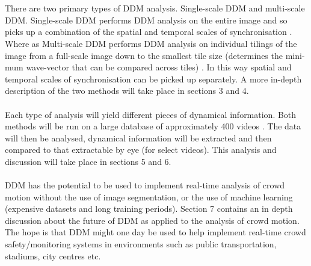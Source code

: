 \documentclass[11pt]{article}
\begin{document}
\\\\
There are two primary types of DDM analysis. Single-scale DDM and multi-scale DDM. Single-scale DDM performs DDM analysis on the entire image and so picks up a combination of the spatial and temporal scales of synchronisation \cite{ddm2}. Where as Multi-scale DDM performs DDM analysis on individual tilings of the image from a full-scale image down to the smallest tile size (determines the mini-mum wave-vector that can be compared across tiles) \cite{ddm2}. In this way spatial and temporal scales of synchronisation can be picked up separately. A more in-depth description of the two methods will take place in sections 3 and 4.  
\\\\
Each type of analysis will yield different pieces of dynamical information. Both methods will be run on a large database of approximately 400 videos \cite{crowdMotionDB}. The data will then be analysed, dynamical information will be extracted and then compared to that extractable by eye (for select videos). This analysis and discussion will take place in sections 5 and 6.
\\\\
DDM has the potential to be used to implement real-time analysis of crowd motion without the use of image segmentation, or the use of machine learning (expensive datasets and long training periods). Section 7 contains an in depth discussion about the future of DDM as applied to the analysis of crowd motion. The hope is that DDM might one day be used to help implement real-time crowd safety/monitoring systems in environments such as public transportation, stadiums, city centres etc.

\clearpage
\end{document}
